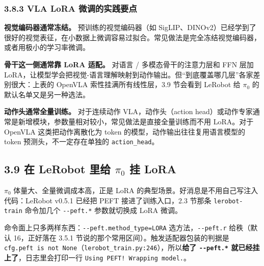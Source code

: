 \documentclass[
  chinese,
]{ctexart}
\begin{document}
\subsubsection{3.8.3 VLA LoRA
微调的实践要点}\label{vla-lora-ux5faeux8c03ux7684ux5b9eux8df5ux8981ux70b9}

\textbf{视觉编码器通常冻结。} 预训练的视觉编码器（如
SigLIP、DINOv2）已经学到了很好的视觉表征，在小数据上微调容易过拟合。常见做法是完全冻结视觉编码器，或者用极小的学习率微调。

\textbf{骨干这一侧通常靠 LoRA 适配。} 对语言 / 多模态骨干的注意力层和
FFN 层加
LoRA，让模型学会把视觉-语言理解映射到动作输出。但``到底覆盖哪几层''各家差别很大：上表的
OpenVLA 索性挂满所有线性层，3.9 节会看到 LeRobot 给 \(\pi_0\)
的默认名单又是另一种选法。

\textbf{动作头通常全量训练。} 对于连续动作 VLA，动作头（action
head）或动作专家通常是新增模块，参数量相对较小，常见做法是直接全量训练而不用
LoRA。对于 OpenVLA 这类把动作离散化为 token
的模型，动作输出往往复用语言模型的 token 预测头，不一定存在单独的
\texttt{action\_head}。

\subsection{\texorpdfstring{3.9 在 LeRobot 里给 \(\pi_0\) 挂
LoRA}{3.9 在 LeRobot 里给 \textbackslash pi\_0 挂 LoRA}}\label{ux5728-lerobot-ux91ccux7ed9-pi_0-ux6302-lora}

\(\pi_0\) 体量大、全量微调成本高，正是 LoRA
的典型场景。好消息是不用自己写注入代码：LeRobot v0.5.1 已经把 PEFT
接进了训练入口，2.3 节那条 \texttt{lerobot-train} 命令加几个
\texttt{-\/-peft.*} 参数就切换成 LoRA 微调。

命令面上只多两样东西：\texttt{-\/-peft.method\_type=LORA}
选方法，\texttt{-\/-peft.r} 给秩（默认 16，正好落在 3.5.1
节说的那个常用区间）。触发适配器包装的判据是
\texttt{cfg.peft\ is\ not\ None}（\texttt{lerobot\_train.py:246}），所以\textbf{给了
\texttt{-\/-peft.*} 就已经挂上了}，日志里会打印一行
\texttt{Using\ PEFT!\ Wrapping\ model.}。
\end{document}
